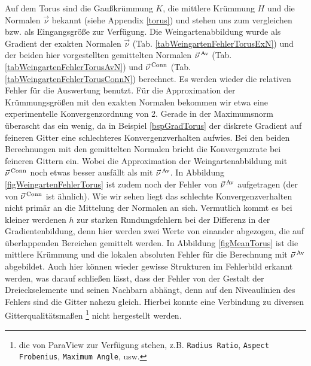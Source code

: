     \begin{beispiel}[Torus]
      Auf dem Torus sind die Gaußkrümmung \( K \), die mittlere Krümmung \( H \) und die Normalen \( \vec{\nu} \) bekannt (siehe Appendix
      \ref{torus}) und stehen uns zum vergleichen bzw. als Eingangsgröße zur Verfügung.
      Die Weingartenabbildung wurde als Gradient der exakten Normalen \( \vec{\nu} \) (Tab. \ref{tabWeingartenFehlerTorusExN})
      und der beiden hier vorgestellten gemittelten Normalen 
      \( \vec{\nu}^{\,\text{Av}} \) (Tab. \ref{tabWeingartenFehlerTorusAvN}) und 
      \( \vec{\nu}^{\,\text{Conn}} \) (Tab. \ref{tabWeingartenFehlerTorusConnN}) berechnet.
      Es werden wieder die relativen Fehler für die Auswertung benutzt.
      Für die Approximation der Krümmungsgrößen mit den exakten Normalen bekommen wir etwa eine experimentelle Konvergenzordnung von 2.
      Gerade in der Maximumsnorm überascht das ein wenig, da in Beispiel \ref{bspGradTorus} der diskrete Gradient auf feineren Gitter eine
      schlechteres Konvergenzverhalten aufwies.
      Bei den beiden Berechnungen mit den gemittelten Normalen bricht die Konvergenzrate bei feineren Gittern ein. 
      Wobei die Approximation der Weingartenabbildung mit \( \vec{\nu}^{\,\text{Conn}} \) noch etwas besser ausfällt als mit \(
      \vec{\nu}^{\,\text{Av}} \).
      In Abbildung \ref{figWeingartenFehlerTorus} ist zudem noch der Fehler von \( \vec{\nu}^{\,\text{Av}} \) aufgetragen 
      (der von \( \vec{\nu}^{\,\text{Conn}} \) ist ähnlich).
      Wie wir sehen liegt das schlechte Konvergenzverhalten nicht primär an die Mittelung der Normalen an sich.
      Vermutlich kommt es bei kleiner werdenen \( h \) zur starken Rundungsfehlern bei der Differenz in der Gradientenbildung, denn
      hier werden zwei Werte von einander abgezogen, die auf überlappenden Bereichen gemittelt werden. 
      In Abbildung \ref{figMeanTorus} ist die mittlere Krümmung und die lokalen absoluten Fehler für die Berechnung mit \(
      \vec{\nu}^{\,\text{Av}} \) abgebildet.
      Auch hier können wieder gewisse Strukturen im Fehlerbild erkannt werden, was darauf schließen lässt, dass der Fehler von der Gestalt
      der Dreieckselemente und seinen Nachbarn abhängt, denn auf den Niveaulinien des Fehlers sind die Gitter nahezu gleich.
      Hierbei konnte eine Verbindung zu diversen Gitterqualitätsmaßen
      \footnote{die von ParaView zur Verfügung stehen, z.B. \texttt{Radius Ratio}, \texttt{Aspect Frobenius}, \texttt{Maximum Angle}, usw.}
      nicht hergestellt werden.
      \begin{table}[htbp]
      \footnotesize
      \centering

\end{table}
\end{beispiel}
